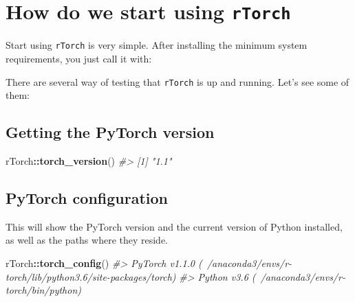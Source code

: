 \documentclass[]{book}
\newenvironment{Shaded}{\begin{snugshade}}{\end{snugshade}}
\newcommand{\CommentTok}[1]{\textcolor[rgb]{0.56,0.35,0.01}{\textit{#1}}}
\newcommand{\KeywordTok}[1]{\textcolor[rgb]{0.13,0.29,0.53}{\textbf{#1}}}
\newcommand{\NormalTok}[1]{#1}
\newcommand{\OperatorTok}[1]{\textcolor[rgb]{0.81,0.36,0.00}{\textbf{#1}}}
\newcommand{\StringTok}[1]{\textcolor[rgb]{0.31,0.60,0.02}{#1}}
\begin{document}
\hypertarget{how-do-we-start-using-rtorch}{%
\section{\texorpdfstring{How do we start using \texttt{rTorch}}{How do we start using rTorch}}\label{how-do-we-start-using-rtorch}}

Start using \texttt{rTorch} is very simple. After installing the minimum system requirements, you just call it with:

\begin{Shaded}
\end{Shaded}

There are several way of testing that \texttt{rTorch} is up and running. Let's see some of them:

\hypertarget{getting-the-pytorch-version}{%
\subsection{Getting the PyTorch version}\label{getting-the-pytorch-version}}

\begin{Shaded}
\begin{Highlighting}[]
\NormalTok{rTorch}\OperatorTok{::}\KeywordTok{torch_version}\NormalTok{()}
\CommentTok{#> [1] "1.1"}
\end{Highlighting}
\end{Shaded}

\hypertarget{pytorch-configuration}{%
\subsection{PyTorch configuration}\label{pytorch-configuration}}

This will show the PyTorch version and the current version of Python installed, as well as the paths where they reside.

\begin{Shaded}
\begin{Highlighting}[]
\NormalTok{rTorch}\OperatorTok{::}\KeywordTok{torch_config}\NormalTok{()}
\CommentTok{#> PyTorch v1.1.0 (~/anaconda3/envs/r-torch/lib/python3.6/site-packages/torch)}
\CommentTok{#> Python v3.6 (~/anaconda3/envs/r-torch/bin/python)}
\end{Highlighting}
\end{Shaded}
\end{document}
